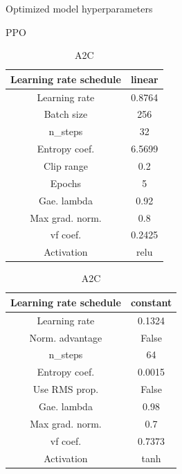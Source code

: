 \documentclass{article}
\begin{document}
\begin{table}[H]
	\caption{Optimized model hyperparameters}
	\begin{subtable}[b]{.4\textwidth}
	\centering
	\caption{PPO}
	\label{t:optimPPO}
	\begin{tabular}{c c}
	Learning rate schedule& linear \\
	\hline
	Learning rate & 0.8764 \\
	\hline
	Batch size & 256 \\
	\hline
	n\_steps & 32 \\
	\hline
	Entropy coef. & 6.5699 \\
	\hline
	Clip range & 0.2 \\
	\hline
	Epochs & 5 \\
	\hline
	Gae. lambda & 0.92 \\
	\hline
	Max grad. norm. & 0.8 \\
	\hline
	vf coef. & 0.2425 \\
	\hline
	Activation & relu \\
	\hline
	\end{tabular}
	\end{subtable}

	\begin{subtable}[b]{.4\textwidth}
	\centering
	\caption{A2C}
	\label{t:optimA2C}
	\begin{tabular}{c c}
	Learning rate schedule& constant \\
	\hline
	Learning rate & 0.1324 \\
	\hline
	Norm. advantage & False \\
	\hline
	n\_steps & 64 \\
	\hline
	Entropy coef. & 0.0015 \\
	\hline
	Use RMS prop. & False \\
	\hline
	Gae. lambda & 0.98 \\
	\hline
	Max grad. norm. & 0.7 \\
	\hline
	vf coef. & 0.7373 \\
	\hline
	Activation & tanh \\
	\hline
	\end{tabular}
	\end{subtable}
	
\end{table}
\end{document}
